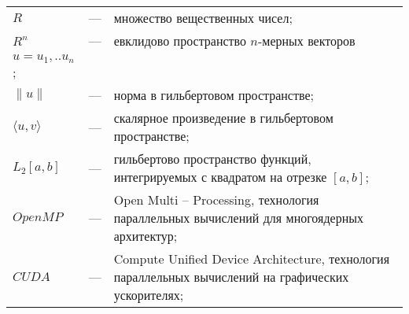
\begin{longtable}{lp{}p{}}

$R$ & --- & множество вещественных чисел;\\

$R^n$ & --- & евклидово пространство $n$-мерных векторов \\ $u=u_1,..u_n$;\\

$\|u\|$ & --- & норма в гильбертовом пространстве;\\

$\langle u, v\rangle$ & --- & скалярное произведение в гильбертовом пространстве;\\

$L_2[a, b]$ & --- & гильбертово пространство функций, интегрируемых с квадратом на отрезке $[a, b]$;\\

$OpenMP$ & --- & Open Multi -- Processing, технология параллельных вычислений для многоядерных архитектур;\\

$CUDA$ & --- & Compute Unified Device Architecture, технология параллельных вычислений на графических ускорителях;\\

\end{longtable}
